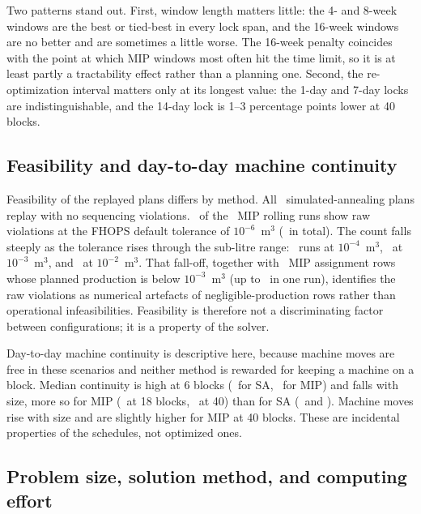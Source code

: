 Two patterns stand out. First, window length matters little: the 4- and 8-week windows are the best
or tied-best in every lock span, and the 16-week windows are no better and are sometimes a little
worse. The 16-week penalty coincides with the point at which MIP windows most often hit the time
limit, so it is at least partly a tractability effect rather than a planning one. Second, the
re-optimization interval matters only at its longest value: the 1-day and 7-day locks are
indistinguishable, and the 14-day lock is 1--3 percentage points lower at 40 blocks.

\subsection{Feasibility and day-to-day machine continuity}

Feasibility of the replayed plans differs by method. All \NRollingRunsSA\ simulated-annealing plans
replay with no sequencing violations. \NRunsWithViolationsMIPRolling\ of the \NRollingRunsMIP\ MIP
rolling runs show raw violations at the FHOPS default tolerance of $10^{-6}$~m$^3$
(\NViolationsMIPRolling\ in total). The count falls steeply as the tolerance rises through the
sub-litre range: \NRunsWithMaterialViolationsOneEMinusFour\ runs at $10^{-4}$~m$^3$,
\NRunsWithMaterialViolations\ at $10^{-3}$~m$^3$, and
\NRunsWithMaterialViolationsOneEMinusTwo\ at $10^{-2}$~m$^3$. That fall-off, together with
\NTinyRowsTotal\ MIP assignment rows whose planned production is below $10^{-3}$~m$^3$ (up to
\NTinyRowsMax\ in one run), identifies the raw violations as numerical artefacts of
negligible-production rows rather than operational infeasibilities. Feasibility is therefore not a
discriminating factor between
configurations; it is a property of the solver.

Day-to-day machine continuity is descriptive here, because machine moves are free in these
scenarios and neither method is rewarded for keeping a machine on a block. Median continuity is high
at 6 blocks (\ContinuityMedianSASix\ for SA, \ContinuityMedianMIPSix\ for MIP) and falls with size,
more so for MIP (\ContinuityMedianMIPEighteen\ at 18 blocks, \ContinuityMedianMIPForty\ at 40) than
for SA (\ContinuityMedianSAEighteen\ and \ContinuityMedianSAForty). Machine moves rise with size and
are slightly higher for MIP at 40 blocks. These are incidental properties of the schedules, not optimized ones.

\subsection{Problem size, solution method, and computing effort}

